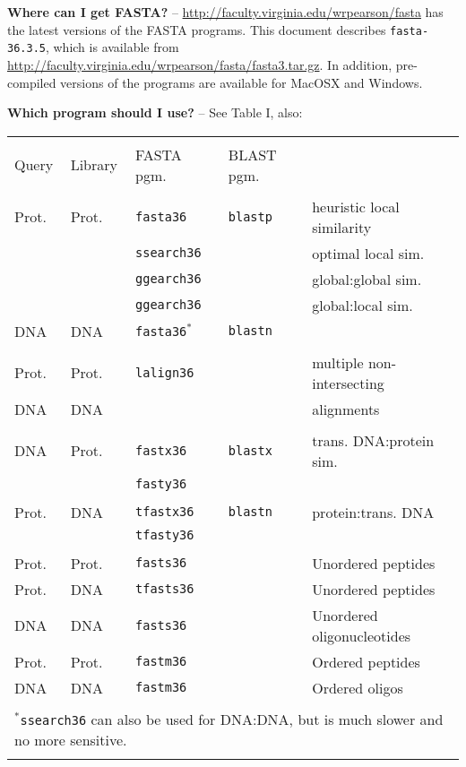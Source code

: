 \documentclass[11pt]{article}
\newcommand{\CURRENT}{fasta-36.3.5}
\begin{document}
{\noindent}\textbf{Where can I get FASTA?} --
\url{http://faculty.virginia.edu/wrpearson/fasta} has the latest
versions of the FASTA programs.  This document describes
\texttt{\CURRENT}, which is available from
\url{http://faculty.virginia.edu/wrpearson/fasta/fasta3.tar.gz}.
In addition, pre-compiled versions of the programs are available for
MacOSX and Windows.

{\noindent}\textbf{Which program should I use?} -- See Table I, also:\\

\begin{tabular}{l l l l l }
\hline \\[-1.0ex]
Query & Library & FASTA pgm. & BLAST pgm. & \\[1.2ex]
\hline \\[-1.0ex]
Prot. & Prot. & \texttt{fasta36} & \texttt{blastp} & heuristic local similarity \\
 &  & \texttt{ssearch36} &  & optimal local sim.\\
 &  & \texttt{ggearch36} &  & global:global sim. \\
 &  & \texttt{ggearch36} &  & global:local sim.\\
DNA & DNA & \texttt{fasta36}$^*$ & \texttt{blastn} & \\[1.2ex]
\hline \\[-1.0ex]
Prot. & Prot. & \texttt{lalign36} & & multiple non-intersecting \\
DNA & DNA & & & alignments \\[1.2ex]
\hline \\[-1.0ex]
DNA & Prot. & \texttt{fastx36} & \texttt{blastx} & trans. DNA:protein sim. \\ 
 &  & \texttt{fasty36} & & \\[1.2ex]
\hline \\[-1.0ex]
Prot. & DNA & \texttt{tfastx36} & \texttt{blastn} & protein:trans. DNA \\
 &  & \texttt{tfasty36} & & \\[1.2ex]
\hline \\[-1.0ex]
Prot. & Prot. & \texttt{fasts36} & & Unordered peptides \\
Prot. & DNA & \texttt{tfasts36} & & Unordered peptides \\
DNA & DNA & \texttt{fasts36} & & Unordered oligonucleotides \\
Prot. & Prot. & \texttt{fastm36} & & Ordered peptides \\
DNA & DNA & \texttt{fastm36} & & Ordered oligos \\[1.2 ex]
\hline \\[-1.0ex]
\multicolumn{5}{l}{$^*$\texttt{ssearch36} can also be used for DNA:DNA, but is much slower and no more sensitive.}\\[0.2ex]
\hline \\
\end{tabular}
\end{document}
